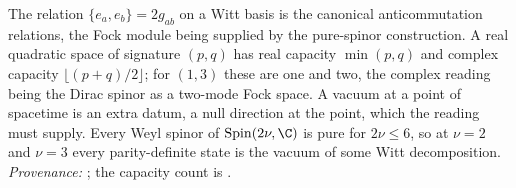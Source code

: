 The relation $\{e_a, e_b\} = 2g_{ab}$ on a Witt basis is the canonical anticommutation relations, the Fock module being supplied by the pure-spinor construction. A real quadratic space of signature $(p,q)$ has real capacity $\min(p,q)$ and complex capacity $\lfloor (p+q)/2 \rfloor$; for $(1,3)$ these are one and two, the complex reading being the Dirac spinor as a two-mode Fock space. A vacuum at a point of spacetime is an extra datum, a null direction at the point, which the reading must supply. Every Weyl spinor of $\mathrm{Spin}(2\nu, \C)$ is pure for $2\nu \leq 6$, so at $\nu = 2$ and $\nu = 3$ every parity-definite state is the vacuum of some Witt decomposition. \emph{Provenance:} \cite[Props.~3.1, 3.2, 4.1(3), Fact~2.10]{ButlerT16}; the capacity count is \cite[Thm.~4.3]{ButlerT3}.
